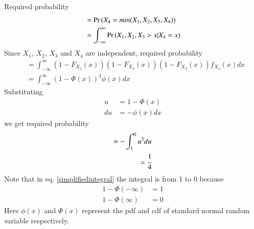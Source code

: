 Required probability
\begin{align}
    &= \Pr\left(X_4 = min(X_1, X_2, X_3, X_4)\right)\\
    &= \int_{-\infty}^{\infty}\Pr\left(X_1, X_2, X_3 > x | X_4 = x\right)
\end{align}
Since $X_1$, $X_2$, $X_3$ and $X_4$ are independent, required probability
\begin{align}
    &= \int_{-\infty}^{\infty} (1-F_{X_1}(x))(1-F_{X_2}(x))(1-F_{X_3}(x))f_{X_4}(x)dx\\
    &= \int_{-\infty}^{\infty} (1-\Phi(x))^3\phi(x)dx
\end{align}
Substituting 
\begin{align}
    u  &= 1 - \Phi(x)\\
    du &= -\phi(x)dx
\end{align}
we get required probability
\begin{align}
    = -\int_1^0 u^3 du\label{simplifiedintegral}\\
    = \cfrac{1}{4}
\end{align}
Note that in eq. \eqref{simplifiedintegral} the  integral is from 1 to 0 because
\begin{align}
    1-\Phi(-\infty) &= 1\\
    1-\Phi(\infty)  &= 0
\end{align}
Here $\phi(x)$ and $\Phi(x)$ represent the pdf and cdf of standard normal random variable respectively.
